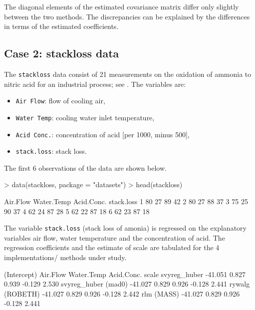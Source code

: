 \documentclass[a4paper,oneside,11pt,DIV=12]{scrartcl}
\newcommand{\code}[1]{{\texttt{#1}}}
\begin{document}
\noindent The diagonal elements of the estimated covariance matrix differ
only slightly between the two methods. The discrepancies can be explained
by the differences in terms of the estimated coefficients.

\subsection{Case 2: stackloss data}\label{sec:stackloss}
The \code{stackloss} data consist of 21 measurements on the oxidation
of ammonia to nitric acid for an industrial process; see \cite{brownlee}.
The variables are:
\begin{itemize}
    \item \code{Air Flow}: flow of cooling air,
    \item \code{Water Temp}: cooling water inlet temperature,
    \item \code{Acid Conc.}: concentration of acid [per 1000, minus 500],
    \item \code{stack.loss}: stack loss.
\end{itemize}

\noindent The first 6 observations of the data are shown below.

\begin{Schunk}
\begin{Sinput}
> data(stackloss, package = "datasets")
> head(stackloss)
\end{Sinput}
\begin{Soutput}
  Air.Flow Water.Temp Acid.Conc. stack.loss
1       80         27         89         42
2       80         27         88         37
3       75         25         90         37
4       62         24         87         28
5       62         22         87         18
6       62         23         87         18
\end{Soutput}
\end{Schunk}

\noindent The variable \code{stack.loss} (stack loss of amonia) is
regressed on the explanatory variables air flow, water temperature and
the concentration of acid. The regression coefficients and the estimate
of scale are tabulated for the 4 implementations/ methods under study.

\begin{Schunk}
\begin{Soutput}
                    (Intercept) Air.Flow Water.Temp Acid.Conc. scale
svyreg_huber            -41.051    0.827      0.939     -0.129 2.530
svyreg_huber (mad0)     -41.027    0.829      0.926     -0.128 2.441
rywalg (ROBETH)         -41.027    0.829      0.926     -0.128 2.442
rlm (MASS)              -41.027    0.829      0.926     -0.128 2.441
\end{Soutput}
\end{Schunk}
\end{document}
